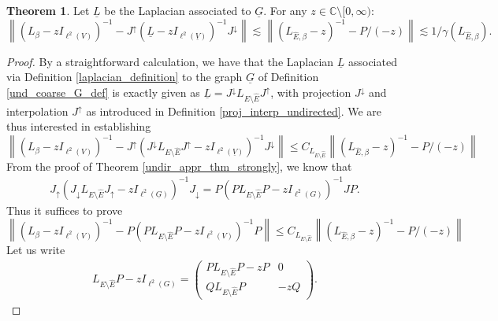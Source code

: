 \documentclass[reqno,12pt,letterpaper]{amsart}
\numberwithin{equation}{section}
\newcommand{\1}{\mathds{1}}
\theoremstyle{definition}
\newtheorem{Thm}[Th]{Theorem}
\begin{document}
\begin{Thm}\label{undir_appr_thm}
Let $\underline{L}$ be the Laplacian associated to $\underline{G}$. For any $z \in \mathds{C} \setminus [0, \infty)$:
	\begin{equation}\label{resolvent_closeness_app}
		\left\|(L_\beta - z I_{\ell^2(V)})^{-1} -  J^\uparrow  (\underline{L} - z I_{\ell^2(\underline{V})})^{-1} J^\downarrow\right\| 
\lesssim	\left\|( L_{\hat{E},\beta} - z)^{-1} - P/(-z) \right\|  \lesssim
			 1/\gamma(L_{\hat{E}, \beta}).
	\end{equation}
\end{Thm}
\begin{proof}
	By a straightforward calculation, we have that the Laplacian $\underline{L}$  associated via Definition \ref{laplacian_definition} to the graph $\underline{G}$ of Definition \ref{und_coarse_G_def}  is exactly given as $	\underline{L} = J^\downarrow  L_{E \setminus \hat{E}}  J^\uparrow$,
	with projection $J^\downarrow$ and interpolation $J^\uparrow$ as introduced in Definition \ref{proj_interp_undirected}. We are thus interested in establishing 
	\begin{equation}
		\left\|(L_\beta - z    I_{\ell^2(V)})^{-1} -  J^\uparrow  (J^\downarrow  L_{E \setminus \hat{E}}  J^\uparrow - z    I_{\ell^2(\underline{V})})^{-1} J^\downarrow\right\|\leq 
		C_{L_{E\setminus \hat{E}}}	\left\|( L_{\hat{E},\beta} - z)^{-1} - P/(-z) \right\|
	\end{equation}
	From the proof of Theorem \ref{undir_appr_thm_strongly}, we know that 
	\begin{align}
		J_\uparrow  (J_\downarrow  L_{E \setminus \hat{E}}  J_\uparrow - z    I_{\ell^2(\underline{G})})^{-1} J_\downarrow 
		=
P (P  L_{E \setminus \hat{E}}  P- z    I_{\ell^2(G)})^{-1}JP.
	\end{align}
Thus it suffices to prove
		\begin{equation}
		\left\|(L_\beta - z I_{\ell^2(V)})^{-1} -  P  (PL_{E \setminus \hat{E}} P - z I_{\ell^2(V)})^{-1} P\right\|\leq  
			C_{L_{E\setminus \hat{E}}}	\left\|( L_{\hat{E},\beta} - z)^{-1} - P/(-z) \right\| 
	\end{equation}
	Let us write 
	\begin{align}
		L_{E \setminus \hat{E}} P -z I_{\ell^2(G)} = 
			\begin{pmatrix}
				PL_{E \setminus \hat{E}} P -zP & 0   \\
			QL_{E \setminus \hat{E}} P    & -z Q
		\end{pmatrix}.
	\end{align}

\end{proof}
\end{document}

